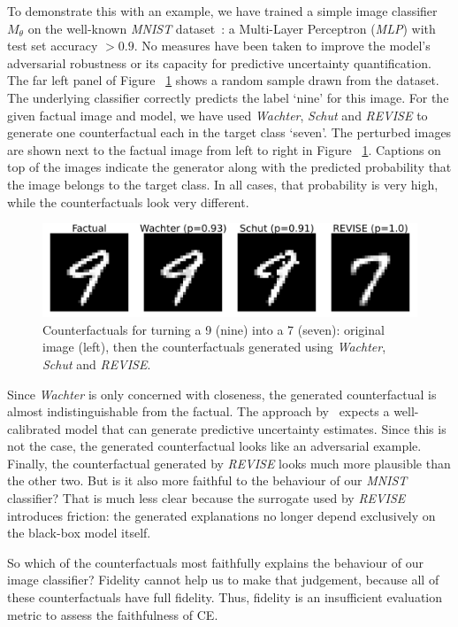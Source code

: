 To demonstrate this with an example, we have trained a simple image classifier $M_{\theta}$ on the well-known \textit{MNIST} dataset~\citep{lecun1998mnist}: a Multi-Layer Perceptron (\textit{MLP}) with test set accuracy $> 0.9$. No measures have been taken to improve the model's adversarial robustness or its capacity for predictive uncertainty quantification. The far left panel of Figure ~\ref{fig:motiv} shows a random sample drawn from the dataset. The underlying classifier correctly predicts the label `nine' for this image. For the given factual image and model, we have used \textit{Wachter}, \textit{Schut} and \textit{REVISE} to generate one counterfactual each in the target class `seven'. The perturbed images are shown next to the factual image from left to right in Figure ~\ref{fig:motiv}. Captions on top of the images indicate the generator along with the predicted probability that the image belongs to the target class. In all cases, that probability is very high, while the counterfactuals look very different.

\begin{figure}
  \centering
  \includegraphics[width=0.8\linewidth]{../www/mnist_motivation.png}
  \caption{Counterfactuals for turning a 9 (nine) into a 7 (seven): original image (left), then the counterfactuals generated using \textit{Wachter}, \textit{Schut} and \textit{REVISE}.}\label{fig:motiv}
\end{figure}

Since \textit{Wachter} is only concerned with closeness, the generated counterfactual is almost indistinguishable from the factual. The approach by~\citet{schut2021generating} expects a well-calibrated model that can generate predictive uncertainty estimates. Since this is not the case, the generated counterfactual looks like an adversarial example. Finally, the counterfactual generated by \textit{REVISE} looks much more plausible than the other two. But is it also more faithful to the behaviour of our \textit{MNIST} classifier? That is much less clear because the surrogate used by \textit{REVISE} introduces friction: the generated explanations no longer depend exclusively on the black-box model itself. 

So which of the counterfactuals most faithfully explains the behaviour of our image classifier? Fidelity cannot help us to make that judgement, because all of these counterfactuals have full fidelity. Thus, fidelity is an insufficient evaluation metric to assess the faithfulness of CE. 

